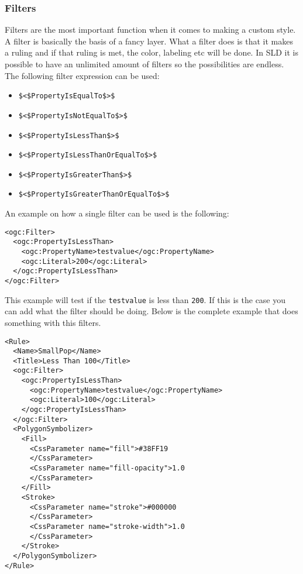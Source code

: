 \subsubsection{Filters}

Filters are the most important function when it comes to making a custom style. A filter is basically the basis of a fancy layer. What a filter does is that it makes a ruling and if that ruling is met, the color, labeling etc will be done. In SLD it is possible to have an unlimited amount of filters so the possibilities are endless. The following filter expression can be used:

\begin{itemize}
	\item \lstinline|$<$PropertyIsEqualTo$>$|
	\item \lstinline|$<$PropertyIsNotEqualTo$>$|
	\item \lstinline|$<$PropertyIsLessThan$>$|
	\item \lstinline|$<$PropertyIsLessThanOrEqualTo$>$|
	\item \lstinline|$<$PropertyIsGreaterThan$>$|
	\item \lstinline|$<$PropertyIsGreaterThanOrEqualTo$>$|
\end{itemize}
An example on how a single filter can be used is the following:
\begin{lstlisting}
<ogc:Filter>
  <ogc:PropertyIsLessThan>
    <ogc:PropertyName>testvalue</ogc:PropertyName>
    <ogc:Literal>200</ogc:Literal>
  </ogc:PropertyIsLessThan>
</ogc:Filter>
\end{lstlisting}
This example will test if the \lstinline|testvalue| is less than \lstinline|200|. If this is the case you can add what the filter should be doing. Below is the complete example that does something with this filters.
\begin{lstlisting}
<Rule>
  <Name>SmallPop</Name>
  <Title>Less Than 100</Title>
  <ogc:Filter>
    <ogc:PropertyIsLessThan>
      <ogc:PropertyName>testvalue</ogc:PropertyName>
      <ogc:Literal>100</ogc:Literal>
    </ogc:PropertyIsLessThan>
  </ogc:Filter>
  <PolygonSymbolizer>
    <Fill>
      <CssParameter name="fill">#38FF19
      </CssParameter>
      <CssParameter name="fill-opacity">1.0
      </CssParameter>
    </Fill>
    <Stroke>
      <CssParameter name="stroke">#000000
      </CssParameter>
      <CssParameter name="stroke-width">1.0
      </CssParameter>
    </Stroke>
  </PolygonSymbolizer>
</Rule>
\end{lstlisting}


